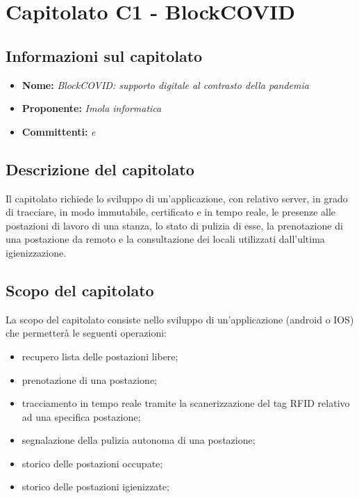 \section{Capitolato C1 - BlockCOVID}
\subsection{Informazioni sul capitolato}
\begin{itemize}
	\item \textbf{Nome:} \textit{BlockCOVID: supporto digitale al contrasto della pandemia}
	\item \textbf{Proponente:} \textit{Imola informatica}
	\item \textbf{Committenti:} \textit{\VT{} e \CR{}}
\end{itemize}

\subsection{Descrizione del capitolato}
Il capitolato richiede lo sviluppo di un'applicazione, con relativo server, in grado di tracciare, in modo immutabile, certificato e in tempo reale, le presenze alle postazioni di lavoro di una stanza, lo stato di pulizia di esse, la prenotazione di una postazione da remoto e la consultazione dei locali utilizzati dall'ultima igienizzazione.

\subsection{Scopo del capitolato}
La scopo del capitolato consiste nello sviluppo di un'applicazione (android o IOS) che permetterà le seguenti operazioni:
\begin{itemize}
	\item recupero lista delle postazioni libere;
	\item prenotazione di una postazione;
	\item tracciamento in tempo reale tramite la scanerizzazione del tag RFID relativo ad una specifica postazione;
	\item segnalazione della pulizia autonoma di una postazione;
	\item storico delle postazioni occupate;
	\item storico delle postazioni igienizzate;
\end{itemize}

